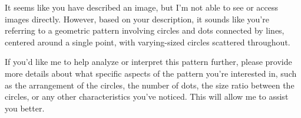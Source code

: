 It seems like you have described an image, but I'm not able to see or access images directly. However, based on your description, it sounds like you're referring to a geometric pattern involving circles and dots connected by lines, centered around a single point, with varying-sized circles scattered throughout.

If you'd like me to help analyze or interpret this pattern further, please provide more details about what specific aspects of the pattern you're interested in, such as the arrangement of the circles, the number of dots, the size ratio between the circles, or any other characteristics you've noticed. This will allow me to assist you better.